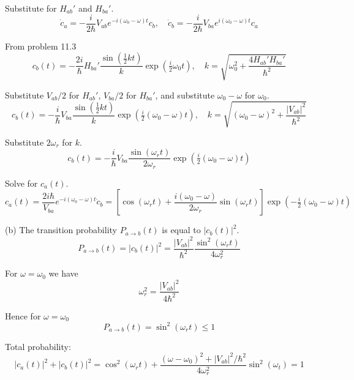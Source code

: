Substitute for $H_{ab}'$ and $H_{ba}'$.
\begin{equation*}
\dot c_a=-\frac{i}{2\hbar}V_{ab}e^{-i(\omega_0-\omega)t}c_b,\quad
\dot c_b=-\frac{i}{2\hbar}V_{ba}e^{i(\omega_0-\omega)t}c_a
\end{equation*}

From problem 11.3
\begin{equation*}
c_b(t)=-\frac{2i}{\hbar}H_{ba}'
\frac{\sin\left(\tfrac{1}{2}kt\right)}{k}
\exp\left(\tfrac{i}{2}\omega_0t\right),\quad
k=\sqrt{\omega_0^2+\frac{4H_{ab}'H_{ba}'}{\hbar^2}}
\end{equation*}

Substitute $V_{ab}/2$ for $H_{ab}'$, $V_{ba}/2$ for $H_{ba}'$,
and substitute $\omega_0-\omega$ for $\omega_0$.
\begin{equation*}
c_b(t)=-\frac{i}{\hbar}V_{ba}
\frac{\sin\left(\tfrac{1}{2}kt\right)}{k}
\exp\left(\tfrac{i}{2}(\omega_0-\omega)t\right),\quad
k=\sqrt{(\omega_0-\omega)^2+\frac{|V_{ab}|^2}{\hbar^2}}
\end{equation*}

Substitute $2\omega_r$ for $k$.
\begin{equation*}
c_b(t)=-\frac{i}{\hbar}V_{ba}
\frac{\sin(\omega_rt)}{2\omega_r}
\exp\left(\tfrac{i}{2}(\omega_0-\omega)t\right)
\end{equation*}

Solve for $c_a(t)$.
\begin{equation*}
c_a(t)=\frac{2i\hbar}{V_{ba}}e^{-i(\omega_0-\omega)t}\dot c_b
=\left[\cos(\omega_rt)+\frac{i(\omega_0-\omega)}{2\omega_r}\sin(\omega_rt)\right]
\exp\left(-\tfrac{i}{2}(\omega_0-\omega)t\right)
\tag{1}
\end{equation*}

(b) The transition probability $P_{a\rightarrow b}(t)$ is equal to $|c_b(t)|^2$.
\begin{equation*}
P_{a\rightarrow b}(t)=|c_b(t)|^2=\frac{|V_{ab}|^2}{\hbar^2}
\frac{\sin^2(\omega_rt)}{4\omega_r^2}
\tag{2}
\end{equation*}

For $\omega=\omega_0$ we have
\begin{equation*}
\omega_r^2=\frac{|V_{ab}|^2}{4\hbar^2}
\end{equation*}

Hence for $\omega=\omega_0$
\begin{equation*}
P_{a\rightarrow b}(t)=\sin^2(\omega_rt)\le1
\end{equation*}

Total probability:
\begin{equation*}
|c_a(t)|^2+|c_b(t)|^2
=\cos^2(\omega_rt)+\frac{(\omega-\omega_0)^2+|V_{ab}|^2/\hbar^2}{4\omega_r^2}\sin^2(\omega_t)=1
\tag{3}
\end{equation*}


